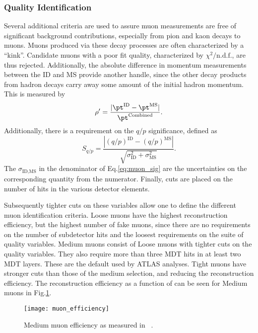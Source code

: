 \subsubsection{Quality Identification}

Several additional criteria are used to assure muon measurements are free of significant background contributions, especially from pion and kaon decays to muons.
Muons produced via these decay processes are often characterized by a ``kink''.
Candidate muons with a poor fit quality, characterized by $\chi^2/\text{n.d.f.}$, are thus rejected.
Additionally, the absolute difference in momentum measurements between the ID and MS provide another handle, since the other decay products from hadron decays carry away some amount of the initial hadron momentum.
This is measured by
\begin{equation}
\rho' = \frac{|\pt^{\text{ID}} - \pt^{\text{MS}} |}{\pt^{\text{Combined}}}.
\end{equation}
Additionally, there is a requirement on the $q/p$ significance, defined as
\begin{equation}\label{eq:muon_sig}
S_{q/p} = \frac{|(q/p)^{\text{ID}} - (q/p)^{\text{MS}} |}{\sqrt{\sigma_{\text{ID}}^2 + \sigma_{\text{MS}}^2  }}.
\end{equation}
The $\sigma_{\text{ID,MS}}$ in the denominator of Eq.\ref{eq:muon_sig} are the uncertainties on the corresponding quantity from the numerator.
Finally, cuts are placed on the number of hits in the various detector elements.

Subsequently tighter cuts on these variables allow one to define the different muon identification criteria.
Loose muons have the highest reconstruction efficiency, but the highest number of fake muons, since there are no requirements on the number of subdetector hits and the loosest requirements on the suite of quality variables.
Medium muons consist of Loose muons with tighter cuts on the quality variables.
They also require more than three MDT hits in at least two MDT layers.
These are the default used by ATLAS analyses.
Tight muons have stronger cuts than those of the medium selection, and reducing the reconstruction efficiency.
The reconstruction efficiency as a function of \pt can be seen for Medium muons in Fig.\ref{fig:muon_eff}.

\begin{figure}
\caption{Medium muon efficiency as measured in ~\cite{PERF-2015-10}.} \label{fig:muon_eff}
\texttt{[image: muon\_efficiency]}
\end{figure}

